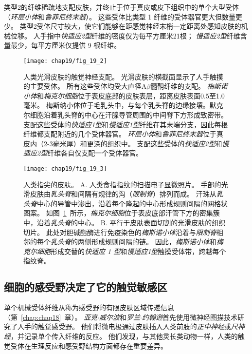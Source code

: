 类型2的纤维稀疏地支配皮肤，并终止于位于真皮或皮下组织中的单个大型受体（\textit{环层小体}和\textit{鲁菲尼终末器}）。 
这些受体比类型 1 纤维的受体器官更大但数量更少。
类型2受体尺寸较大，使它们能够在距感觉神经末梢一定距离处感知皮肤的机械位移。
人手指中\textit{快适应2型}纤维的密度仅为每平方厘米21根；
\textit{慢适应2型}纤维含量最少，每平方厘米仅提供 9 根纤维。


\begin{figure}[htbp]
	\centering
	\texttt{[image: chap19/fig\_19\_2]}
	\caption{人类光滑皮肤的触觉神经支配。
		光滑皮肤的横截面显示了人手触摸的主要受体。
		所有这些受体均受大直径A$\beta$髓鞘纤维的支配。
		\textit{梅斯诺小体}和\textit{梅克尔细胞}位于表皮底部的皮肤表层，距离皮肤表面0.5至1.0毫米。
		梅斯纳小体位于毛乳头中，与每个乳头脊的边缘接壤。默克尔细胞沿着乳头脊的中心在汗腺导管周围的中间脊下方形成致密带。
		支配这些受体的\textit{快适应1型}和\textit{慢适应1型}纤维在其末端分支，因此每根纤维都支配附近的几个受体器官。
		\textit{环层小体}和\textit{鲁菲尼终末器}位于真皮内（2-3毫米厚）和更深的组织中。
		支配这些受体的\textit{快适应2型}和\textit{慢适应2型}纤维各自仅支配一个受体器官。}
	\label{fig:19_2}
\end{figure}


\begin{figure}[htbp]
	\centering
	\texttt{[image: chap19/fig\_19\_3]}
	\caption{人类指尖的皮肤。
		A. 人类食指指纹的扫描电子显微照片。
		手部的光滑皮肤由\textit{乳头脊}和间隔有规律的沟（\textit{限制脊}）排列而成。
		汗珠从\textit{乳头脊}中心的导管中渗出，沿着每个隆起的中心形成规则间隔的网格状图案。
		如图~\ref{fig:19_2}~所示，\textit{梅克尔细胞}位于表皮底部汗管下方的密集簇中，沿着\textit{乳头脊}的中心。
		 B. 平行于皮肤表面切割的光滑皮肤的组织切片。
		 此处对胆碱酯酶进行免疫染色的\textit{梅斯诺小体}沿着与\textit{限制脊}相邻的每个\textit{乳头脊}的两侧形成规则间隔的链。
		 因此，\textit{梅斯诺小体}和\textit{梅克尔细胞}形成交替的\textit{快适应 1 型}和\textit{慢适应1型}触摸受体带，跨越每个指纹脊\cite{bolanowski2003organization}。}
	\label{fig:19_3}
\end{figure}



\subsection{细胞的感受野决定了它的触觉敏感区}

单个机械受体纤维从称为感受野的有限皮肤区域传递信息（第~\ref{chap:chap18}~章）。
\textit{亚克$\cdot$威尔波}和\textit{罗兰$\cdot$约翰逊}首先使用微神经图描技术研究了人手的触觉感受野。
他们将微电极通过皮肤插入人类前肢的\textit{正中神经}或\textit{尺神经}，并记录单个传入纤维的反应。
他们发现，与其他灵长类动物一样，人类的触觉受体在生理反应和感受野结构方面都存在重要差异。


